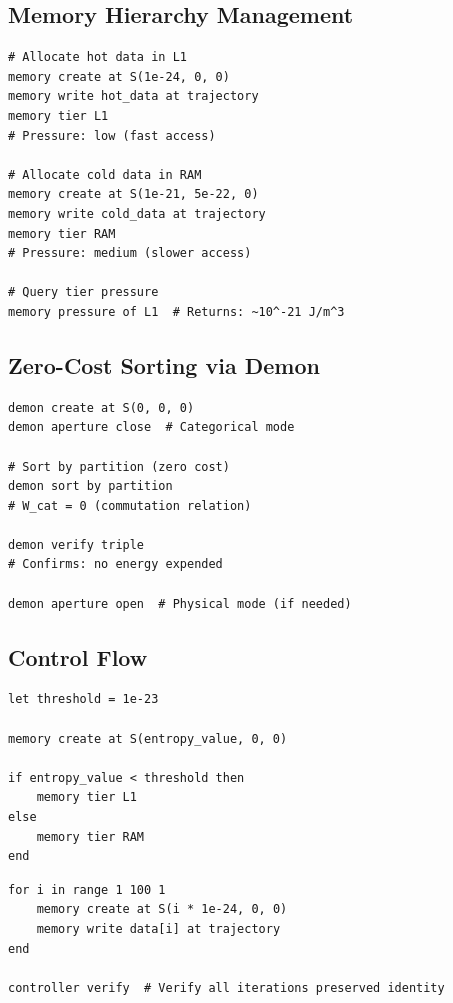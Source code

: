 \documentclass[twocolumn,10pt]{article}
\theoremstyle{definition}
\theoremstyle{remark}
\begin{document}
\subsection{Memory Hierarchy Management}

\begin{lstlisting}[caption={Tier-aware memory allocation}]
# Allocate hot data in L1
memory create at S(1e-24, 0, 0)
memory write hot_data at trajectory
memory tier L1
# Pressure: low (fast access)

# Allocate cold data in RAM
memory create at S(1e-21, 5e-22, 0)
memory write cold_data at trajectory
memory tier RAM
# Pressure: medium (slower access)

# Query tier pressure
memory pressure of L1  # Returns: ~10^-21 J/m^3
\end{lstlisting}

\subsection{Zero-Cost Sorting via Demon}

\begin{lstlisting}[caption={Demon-based zero-cost sort}]
demon create at S(0, 0, 0)
demon aperture close  # Categorical mode

# Sort by partition (zero cost)
demon sort by partition
# W_cat = 0 (commutation relation)

demon verify triple
# Confirms: no energy expended

demon aperture open  # Physical mode (if needed)
\end{lstlisting}

\subsection{Control Flow}

\begin{lstlisting}[caption={Conditional execution}]
let threshold = 1e-23

memory create at S(entropy_value, 0, 0)

if entropy_value < threshold then
    memory tier L1
else
    memory tier RAM
end
\end{lstlisting}

\begin{lstlisting}[caption={Iteration}]
for i in range 1 100 1
    memory create at S(i * 1e-24, 0, 0)
    memory write data[i] at trajectory
end

controller verify  # Verify all iterations preserved identity
\end{lstlisting}
\end{document}
